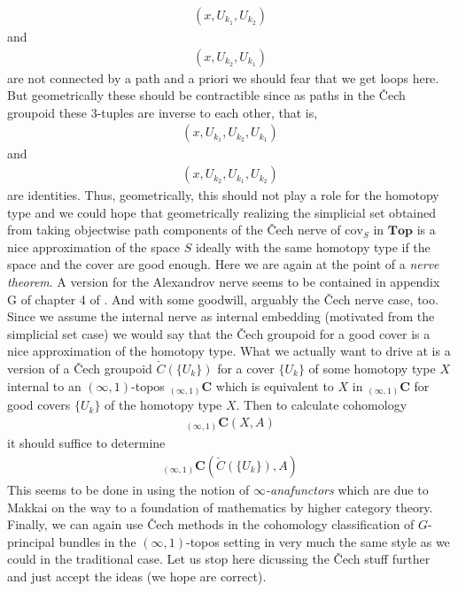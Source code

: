 \begin{align*}
  \left(
    x,
    U_{k_{1}},
    U_{k_{2}}
  \right)
\end{align*}
and
\begin{align*}
  \left(
    x,
    U_{k_{2}},
    U_{k_{1}}
  \right)
\end{align*}
are not connected by a path and a priori we should fear that we get loops here. But geometrically these should be contractible since as paths in the \v{C}ech groupoid these $3$-tuples are inverse to each other, that is,
\begin{align*}
  \left(
    x,
    U_{k_{1}},
    U_{k_{2}},
    U_{k_{1}}
  \right)
\end{align*}
and
\begin{align*}
  \left(
    x,
    U_{k_{2}},
    U_{k_{1}},
    U_{k_{2}}
  \right)
\end{align*}
are identities. Thus, geometrically, this should not play a role for the homotopy type and we could hope that geometrically realizing the simplicial set obtained from taking objectwise path components of the \v{C}ech nerve of $\mathrm{cov}_{S}$ in $\mathbf{Top}$ is a nice approximation of the space $S$ ideally with the same homotopy type if the space and the cover are good enough. Here we are again at the point of a \textit{nerve theorem}. A version for the Alexandrov nerve seems to be contained in appendix G of chapter 4 of \cite{8b5861fc}. And with some goodwill, arguably the \v{C}ech nerve case, too. Since we assume the internal nerve as internal embedding (motivated from the simplicial set case) we would say that the \v{C}ech groupoid for a good cover is a nice approximation of the homotopy type. What we actually want to drive at is a version of a \v{C}ech groupoid $\check{C}(\lbrace U_{k} \rbrace)$ for a cover $\lbrace U_{k} \rbrace$ of some homotopy type $X$ internal to an $(\infty,1)$-topos ${}_{(\infty,1)}\mathbf{C}$ which is equivalent to $X$ in ${}_{(\infty,1)}\mathbf{C}$ for good covers $\lbrace U_{k} \rbrace$ of the homotopy type $X$. Then to calculate cohomology
\begin{align*}
  {}_{(\infty,1)}\mathbf{C}
  \left(
    X,
    A
  \right)
\end{align*}
it should suffice to determine
\begin{align*}
  {}_{(\infty,1)}\mathbf{C}
  \left(
    \check{C}(\lbrace U_{k} \rbrace),
    A
  \right)
\end{align*}
This seems to be done in \cite{a565d200} using the notion of \textit{$\infty$-anafunctors} which are due to Makkai on the way to a foundation of mathematics by higher category theory. Finally, we can again use \v{C}ech methods in the cohomology classification of $G$-principal bundles in the $(\infty,1)$-topos
 setting in very much the same style as we could in the traditional case. Let us stop here dicussing the \v{C}ech stuff further and just accept the ideas (we hope are correct).
